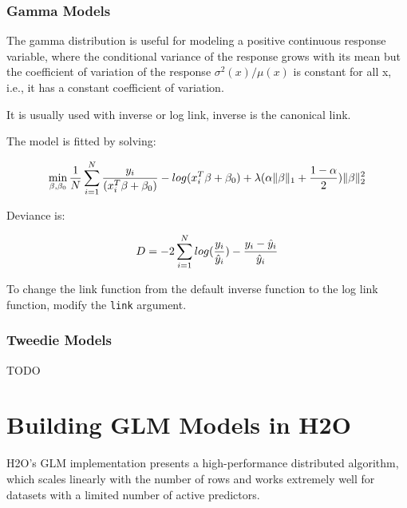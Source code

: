 

\subsubsection{Gamma Models}
The gamma distribution is useful for modeling a positive continuous response variable, where the conditional
variance of the response grows with its mean but the coefficient of variation of the response $\sigma^2(x)/μ(x)$ is
constant for all x, i.e., it has a constant coefficient of variation.

It is usually used with inverse or log link, inverse is the canonical link.

The model is fitted by solving:

\[  \min\limits_{\beta,\beta_0} { {1 \over N}\sum\limits_{i=1}\limits^{N}{y_i \over (x_i^{T}\beta  + \beta_0)} - log({x_i^{T}\beta  + \beta_0})  + \lambda (\alpha \|\beta \|_1 + {1-\alpha \over 2}) \| \beta \|_2^2} \]

Deviance is:

\[D = -2\sum\limits_{i=1}\limits^{N}{log({y_i \over \hat{y}_i}) - {y_i - \hat{y}_i \over\hat{y}_i }}\]

\waterExampleInR

To change the link function from the default inverse function to the log link function, modify the \texttt{link}
argument.



\subsubsection{Tweedie Models}

TODO




\section{Building GLM Models in H2O}

H2O's GLM implementation presents a high-performance distributed algorithm, which scales linearly with the number
of rows and works extremely well for datasets with a limited number of active predictors.

